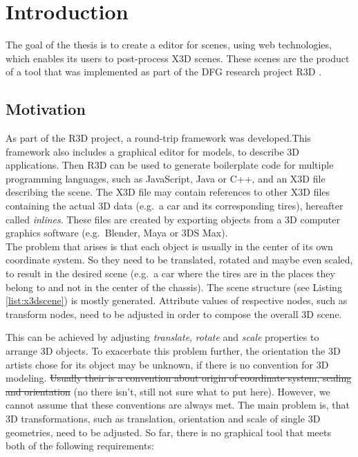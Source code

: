 
\section{Introduction}
\label{sec:Prelude}

The goal of the thesis is to create a editor for  scenes, using web technologies,
which enables its users to post-process \gls{X3D} scenes. These scenes are the
product of a tool that was implemented as part of the DFG research
project \gls{R3D} \cite{Jung:2015:SDA:2802768.2802837}.
\subsection{Motivation}\label{motivation}

As part of the \gls{R3D} project, a round-trip framework
 was developed.This framework also includes a
graphical editor for  models, to describe \gls{3D} applications. Then
\gls{R3D} can be used to generate boilerplate code for multiple programming
languages, such as JavaScript, Java or C++, and an \gls{X3D} file describing
the scene. The \gls{X3D} file may contain references to other \gls{X3D} files
containing the actual \gls{3D} data (e.g.~a car and its corresponding tires),
hereafter called \emph{inlines}. These files are created by exporting
objects from a \gls{3D} computer graphics software (e.g.~Blender,
Maya or 3DS Max).\\
The problem that arises is that each object is usually in the center of
its own coordinate system. So they need to be translated, rotated and
maybe even scaled, to result in the desired scene (e.g.~a car where the tires
are in the places they belong to and not in the center of the chassis).
The scene structure (see Listing \ref{list:x3dscene}) is mostly generated. Attribute values of respective nodes,
such as transform nodes, need to be adjusted in order to compose the
overall \gls{3D} scene.


This can be achieved by adjusting \emph{translate}, \emph{rotate} and
\emph{scale} properties to arrange \gls{3D} objects. To exacerbate this problem
further, the orientation the \gls{3D} artists chose for its object may be unknown, if
there is no convention for \gls{3D} modeling. \sout{Usually their is a convention
about origin of coordinate system, scaling and orientation} (no there isn't, still
not sure what to put here). However, we cannot assume that these conventions are
always met. The main problem is, that \gls{3D} transformations, such as translation,
orientation and scale of single \gls{3D} geometries, need to be adjusted. So far,
there is no graphical tool that meets both of the following requirements:

